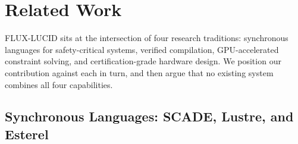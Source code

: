 \documentclass[conference]{IEEEtran}
\begin{document}
%
%
%
%
%



\section{Related Work}
\label{sec:related}

FLUX-LUCID sits at the intersection of four research traditions:
synchronous languages for safety-critical systems, verified compilation,
GPU-accelerated constraint solving, and certification-grade hardware design.
We position our contribution against each in turn, and then argue that no
existing system combines all four capabilities.

\subsection{Synchronous Languages: SCADE, Lustre, and Esterel}
\label{sec:related-synchronous}
\end{document}
